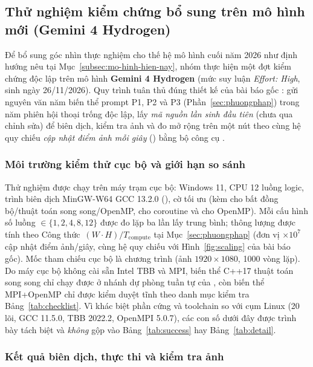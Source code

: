 \subsection{Thử nghiệm kiểm chứng bổ sung trên mô hình mới (Gemini 4 Hydrogen)}\label{subsec:gemini4}

Để bổ sung góc nhìn thực nghiệm cho thế hệ mô hình cuối năm 2026 như định hướng
nêu tại Mục~\ref{subsec:mo-hinh-hien-nay}, nhóm thực hiện một đợt kiểm chứng độc
lập trên mô hình \textbf{Gemini 4 Hydrogen} (mức suy luận \emph{Effort: High},
sinh ngày 26/11/2026). Quy trình tuân thủ đúng thiết kế của bài báo gốc
\cite{diehl2026}: gửi nguyên văn năm biến thể prompt P1, P2 và P3 (Phần~\ref{sec:phuongphap})
trong năm phiên hội thoại trống độc lập, lấy \emph{mã nguồn lần sinh đầu tiên}
(chưa qua chỉnh sửa) để biên dịch, kiểm tra ảnh và đo mở rộng trên một nút theo
cùng hệ quy chiếu \emph{cập nhật điểm ảnh mỗi giây} () bằng bộ công cụ .

\subsubsection{Môi trường kiểm thử cục bộ và giới hạn so sánh}

Thử nghiệm được chạy trên máy trạm cục bộ: Windows 11, CPU 12 luồng logic, trình
biên dịch MinGW-W64 GCC 13.2.0 (), cờ tối ưu
 (kèm  cho bất đồng bộ/thuật toán song
song/OpenMP,  cho coroutine và  cho OpenMP). Mỗi
cấu hình số luồng  $\in\{1,2,4,8,12\}$ được đo lặp ba lần lấy trung bình;
thông lượng được tính theo Công thức~$(W\cdot H)/T_{\text{compute}}$ tại
Mục~\ref{sec:phuongphap} (đơn vị $\times 10^7$ cập nhật điểm ảnh/giây, cùng hệ
quy chiếu với Hình~\ref{fig:scaling} của bài báo gốc). Mốc tham chiếu cục bộ là
chương trình  (ảnh $1920\times1080$, 1000
vòng lặp). Do máy cục bộ không cài sẵn Intel TBB và MPI, biến thể C++17 thuật toán
song song chỉ chạy được ở nhánh dự phòng tuần tự của , còn biến
thể MPI+OpenMP chỉ được kiểm duyệt tĩnh theo danh mục kiểm tra
Bảng~\ref{tab:checklist}. Vì khác biệt phần cứng và toolchain so với cụm Linux
 (20 lõi, GCC 11.5.0, TBB 2022.2, OpenMPI 5.0.7), các con số dưới đây
được trình bày tách biệt và \emph{không} gộp vào Bảng~\ref{tab:success} hay
Bảng~\ref{tab:detail}.

\subsubsection{Kết quả biên dịch, thực thi và kiểm tra ảnh}

